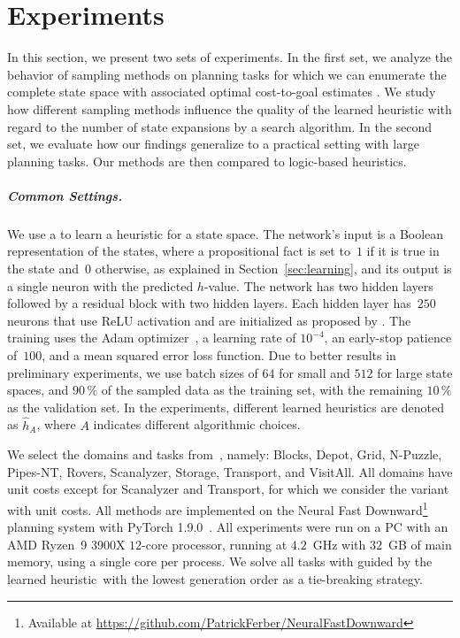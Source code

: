 \chapter{Experiments}
\label{sec:experiments}

In this section, we present two sets of experiments.  In the first set, we analyze the behavior of sampling methods on planning tasks for which we can enumerate the complete state space with associated optimal cost-to-goal estimates \hstar.  We study how different sampling methods influence the quality of the learned heuristic with regard to the number of state expansions by a search algorithm.  In the second set, we evaluate how our findings generalize to a practical setting with large planning tasks. Our methods are then compared to logic-based heuristics.

\paragraph{Common Settings.}
\label{sec:methodology}

We use a  \cite{He.etal/2016} to learn a heuristic for a state space. The network's input is a Boolean representation of the states, where a propositional fact is set to~$1$ if it is true in the state and~$0$ otherwise, as explained in Section~\ref{sec:learning}, and its output is a single neuron with the predicted $h$-value. The network has two hidden layers followed by a residual block with two hidden layers. Each hidden layer has~$250$ neurons that use ReLU activation and are initialized as proposed by \citeyear{He.etal/2015}. The training uses the Adam optimizer~\cite{Kingma.Ba/2015}, a learning rate of $10^{-4}$, an early-stop patience of~$100$, and a mean squared error loss function. Due to better results in preliminary experiments, we use batch sizes of $64$ for small and $512$ for large state spaces, and $90\,\%$ of the sampled data as the training set, with the remaining $10\,\%$ as the validation set. In the experiments, different learned heuristics are denoted as $\hat h_A$, where $A$ indicates different algorithmic choices.

We select the domains and tasks from~\citeyear{Ferber.etal/2022}, namely: Blocks, Depot, Grid, N-Puzzle, Pipes-NT, Rovers, Scanalyzer, Storage, Transport, and VisitAll. All domains have unit costs except for Scanalyzer and Transport, for which we consider the variant with unit costs. All methods are implemented on the Neural Fast Downward\footnote{Available at \url{https://github.com/PatrickFerber/NeuralFastDownward}} planning system with PyTorch 1.9.0~\cite{Ferber.etal/2020a,Paszke/2019}.
All experiments were run on a PC with an AMD Ryzen~9 3900X $12$-core processor, running at $4.2$~GHz with $32$~GB of main memory, using a single core per process. We solve all tasks with \gbfs guided by the learned heuristic~\hnn with the lowest generation order as a tie-breaking strategy.

